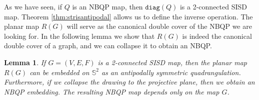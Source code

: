 \documentclass[10pt,a4paper]{article}
\newtheorem{lemma}[theorem]{Lemma}
\newcommand{\Sb}[0]{\mathbb{S}}
\newcommand{\diag}[0]{\mathtt{diag}}
\begin{document}
As we have seen, if $Q$ is an NBQP map, then $\diag(Q)$ is a 2-connected SISD map.  Theorem \ref{thm:strisantipodal} allows us to define the inverse operation. 
The planar map $R(G)$ will serve as the canonical double cover of the NBQP we are looking for. In the following lemma we  show that $R(G)$ is indeed the canonical double cover of a graph, and we can collapse it to obtain an NBQP.

\begin{lemma}\label{lem:sisdtoquad}
    If $G=(V,E,F)$ is a 2-connected SISD map, then the planar map $R(G)$ can be embedded on $\Sb^2$ as an antipodally symmetric quadrangulation. Furthermore, if we collapse the drawing to the projective plane, then we obtain an NBQP embedding. The resulting NBQP map depends only on the map $G$.
\end{lemma}
\end{document}
